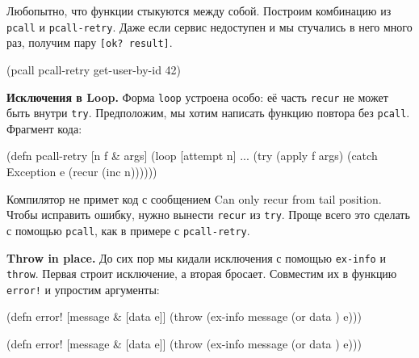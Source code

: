Любопытно, что функции стыкуются между собой. Построим комбинацию из
\verb|pcall| и \verb|pcall-retry|. Даже если сервис недоступен и мы
стучались в него много раз, получим пару \verb|[ok? result]|.

\begin{english}
  \begin{clojure}
(pcall pcall-retry get-user-by-id 42)
  \end{clojure}
\end{english}

\textbf{Исключения в Loop.} Форма \verb|loop| устроена особо: её часть
\verb|recur| не может быть внутри \verb|try|. Предположим, мы хотим написать
функцию повтора без \verb|pcall|. Фрагмент кода:


\begin{english}
  \begin{clojure}
(defn pcall-retry [n f & args]
  (loop [attempt n]
    ...
    (try
      (apply f args)
      (catch Exception e
        (recur (inc n))))))
  \end{clojure}
\end{english}

Компилятор не примет код с сообщением Can only recur from tail
position. Чтобы исправить ошибку, нужно вынести \verb|recur| из
\verb|try|. Проще всего это сделать с помощью \verb|pcall|, как в примере с
\verb|pcall-retry|.

\textbf{Throw in place.} До сих пор мы кидали исключения с помощью
\verb|ex-info| и \verb|throw|. Первая строит исключение, а вторая
бросает. Совместим их в функцию \verb|error!| и упростим аргументы:


\ifx\devicetype\mobile

\begin{english}
  \begin{clojure}
(defn error! [message & [data e]]
  (throw (ex-info message
           (or data {}) e)))
  \end{clojure}
\end{english}

\else

\begin{english}
  \begin{clojure}
(defn error! [message & [data e]]
  (throw (ex-info message (or data {}) e)))
  \end{clojure}
\end{english}

